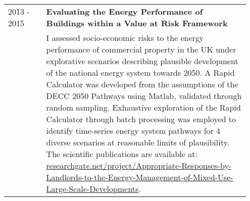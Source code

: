 \documentclass[11pt, oneside]{article}   	%
\begin{document}
\begin{table}[h]
\begin{center}
\begin{tabular}{p{0.15\linewidth} p{0.8\linewidth}}
2013 - 2015&\textbf{Evaluating the Energy Performance of Buildings within a Value at Risk Framework} \\
&I assessed socio-economic risks to the energy performance of commercial property in the UK under explorative scenarios describing plausible development of the national energy system towards 2050. A Rapid Calculator was developed from the assumptions of the DECC 2050 Pathways using Matlab, validated through random sampling. Exhaustive exploration of the Rapid Calculator through batch processing was employed to identify time-series energy system pathways for 4 diverse scenarios at reasonable limits of plausibility. The scientific publications are available at:
 \href{researchgate.net/project/Appropriate-Responses-by-Landlords-to-the-Energy-Management-of-Mixed-Use-Large-Scale-Developments}{researchgate.net/project/Appropriate-Responses-by-Landlords-to-the-Energy-Management-of-Mixed-Use-Large-Scale-Developments}. \\
\hline
\end{tabular}
\end{center}
\vspace{-10mm}
\end{table}

\pagebreak
\end{document}
